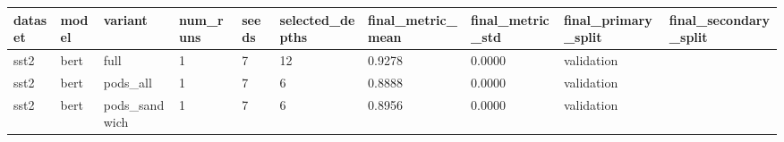 \begin{tabular}{llllllllll}
\hline
dataset & model & variant & num\_runs & seeds & selected\_depths & final\_metric\_mean & final\_metric\_std & final\_primary\_split & final\_secondary\_split \\
\hline
sst2 & bert & full & 1 & 7 & 12 & 0.9278 & 0.0000 & validation &  \\
sst2 & bert & pods\_all & 1 & 7 & 6 & 0.8888 & 0.0000 & validation &  \\
sst2 & bert & pods\_sandwich & 1 & 7 & 6 & 0.8956 & 0.0000 & validation &  \\
\hline
\end{tabular}
